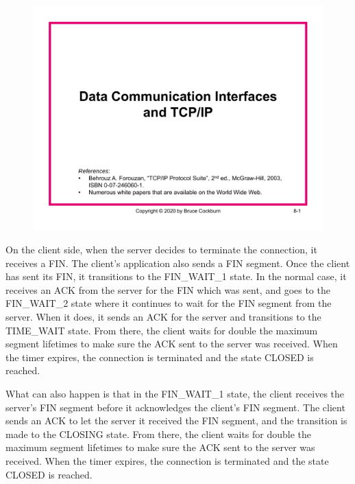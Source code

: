 \begin{figure}[H]
  \centering
\includegraphics[page=41, width=\textwidth]{../../notes/Ch8_W20_TCP_IP.pdf}
\end{figure}
On the client side, when the server decides to terminate the connection, it
receives a FIN. The client's application also sends a FIN segment. Once the
client has sent its FIN, it transitions to the FIN\_WAIT\_1 state. In the normal
case, it receives an ACK from the server for the FIN which was sent, and goes to
the FIN\_WAIT\_2 state where it continues to wait for the FIN segment from the
server. When it does, it sends an ACK for the server and transitions to the
TIME\_WAIT state. From there, the client waits for double the maximum segment
lifetimes to make sure the ACK sent to the server was received. When the timer
expires, the connection is terminated and the state CLOSED is reached.

What can also happen is that in the FIN\_WAIT\_1 state, the client receives the
server's FIN segment before it acknowledges the client’s FIN segment. The client
sends an ACK to let the server it received the FIN segment, and the transition
is made to the CLOSING state. From there, the client waits for double the
maximum segment lifetimes to make sure the ACK sent to the server was received.
When the timer expires, the connection is terminated and the state CLOSED is
reached.


